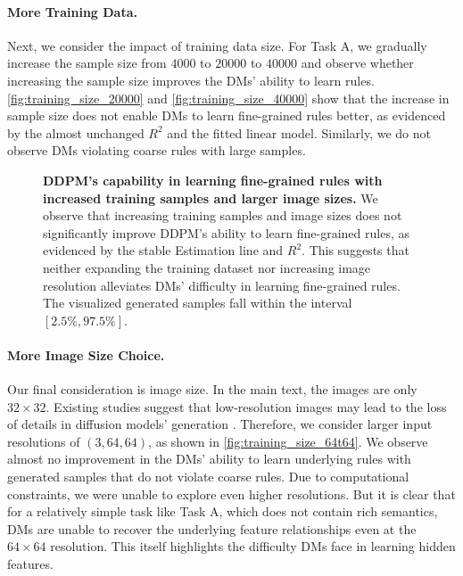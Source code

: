 \paragraph{More Training Data.}Next, we consider the impact of training data size. For Task A, we gradually increase the sample size from $4000$ to $20000$ to $40000$ and observe whether increasing the sample size improves the DMs' ability to learn rules. \cref{fig:training_size_20000} and \cref{fig:training_size_40000} show that the increase in sample size does not enable DMs to learn fine-grained rules better, as evidenced by the almost unchanged $R^2$ and the fitted linear model. Similarly, we do not observe DMs violating coarse rules with large samples.
\begin{figure}[t!]
\centering
    \hfill
    \hfill
    \hfill
    \hfill
\vspace{-0.15in}
\caption{\textbf{DDPM's capability in learning fine-grained rules with increased training samples and larger image sizes.} We observe that increasing training samples and image sizes does not significantly improve DDPM's ability to learn fine-grained rules, as evidenced by the stable Estimation line and $R^2$. This suggests that neither expanding the training dataset nor increasing image resolution alleviates DMs' difficulty in learning fine-grained rules. The visualized generated samples fall within the  interval $[2.5\%, 97.5\%]$.}
\vspace{-0.15in}
\label{fig:training_datasize}
\end{figure}
\paragraph{More Image Size Choice.}Our final consideration is image size. In the main text, the images are only $32 \times 32$. Existing studies suggest that low-resolution images may lead to the loss of details in diffusion models' generation \cite{chen2024image,niu2024acdmsr,li2024scalability}. Therefore, we consider larger input resolutions of $(3,64,64)$, as shown in \cref{fig:training_size_64t64}. We observe almost no improvement in the DMs' ability to learn underlying rules with generated samples that do not violate coarse rules. Due to computational constraints, we were unable to explore even higher resolutions. But it is clear that for a relatively simple task like Task A, which does not contain rich semantics, DMs are unable to recover the underlying feature relationships even at the $64 \times 64$ resolution. This itself highlights the difficulty DMs face in learning hidden features.



